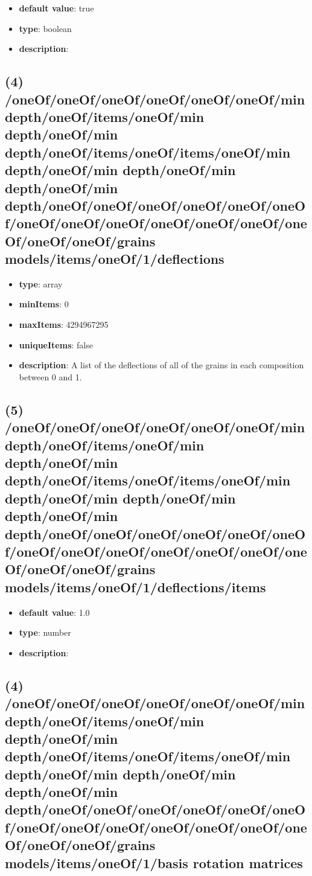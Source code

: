\begin{itemize}[leftmargin=5em]\item {\bf default value}: true
\item {\bf type}: boolean
\item {\bf description}: 
\end{itemize}\subsection{(4) /oneOf/oneOf/oneOf/oneOf/oneOf/oneOf/min depth/oneOf/items/oneOf/min depth/oneOf/min depth/oneOf/items/oneOf/items/oneOf/min depth/oneOf/min depth/oneOf/min depth/oneOf/min depth/oneOf/oneOf/oneOf/oneOf/oneOf/oneOf/oneOf/oneOf/oneOf/oneOf/oneOf/oneOf/oneOf/oneOf/oneOf/grains models/items/oneOf/1/deflections}
\begin{itemize}[leftmargin=4em]\item {\bf type}: array
\item {\bf minItems}: 0
\item {\bf maxItems}: 4294967295
\item {\bf uniqueItems}: false
\item {\bf description}: A list of the deflections of all of the grains in each composition between 0 and 1.
\end{itemize}\subsection{(5) /oneOf/oneOf/oneOf/oneOf/oneOf/oneOf/min depth/oneOf/items/oneOf/min depth/oneOf/min depth/oneOf/items/oneOf/items/oneOf/min depth/oneOf/min depth/oneOf/min depth/oneOf/min depth/oneOf/oneOf/oneOf/oneOf/oneOf/oneOf/oneOf/oneOf/oneOf/oneOf/oneOf/oneOf/oneOf/oneOf/oneOf/grains models/items/oneOf/1/deflections/items}
\begin{itemize}[leftmargin=5em]\item {\bf default value}: 1.0
\item {\bf type}: number
\item {\bf description}: 
\end{itemize}\subsection{(4) /oneOf/oneOf/oneOf/oneOf/oneOf/oneOf/min depth/oneOf/items/oneOf/min depth/oneOf/min depth/oneOf/items/oneOf/items/oneOf/min depth/oneOf/min depth/oneOf/min depth/oneOf/min depth/oneOf/oneOf/oneOf/oneOf/oneOf/oneOf/oneOf/oneOf/oneOf/oneOf/oneOf/oneOf/oneOf/oneOf/oneOf/grains models/items/oneOf/1/basis rotation matrices}
